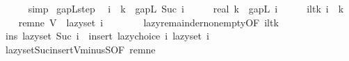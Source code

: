\begin{isabellebody}
\ \ \ \ \isamarkupfalse%
\ simp\isanewline
{}\isamarkupfalse%
%
\endisatagproof
{\isafoldproof}%
%
\isadelimproof
\isanewline
%
\endisadelimproof
\isanewline
{}\isamarkupfalse%
\ gapL{\isacharunderscore}{\kern0pt}step{\isacharcolon}{\kern0pt}\isanewline
\ \ {\isachardoublequoteopen}i\ {\isacharless}{\kern0pt}\ k\ {\isasymLongrightarrow}\ gapL\ {\isacharparenleft}{\kern0pt}Suc\ i{\isacharparenright}{\kern0pt}\ {\isasymle}\ {\isacharparenleft}{\kern0pt}{}\ {\isacharminus}{\kern0pt}\ {}\ {\isacharslash}{\kern0pt}\ real\ k{\isacharparenright}{\kern0pt}\ {\isacharasterisk}{\kern0pt}\ gapL\ i{\isachardoublequoteclose}\isanewline
%
\isadelimproof
%
\endisadelimproof
%
\isatagproof
{}\isamarkupfalse%
\ {\isacharminus}{\kern0pt}\isanewline
\ \ \isamarkupfalse%
\ i{\isacharunderscore}{\kern0pt}lt{\isacharunderscore}{\kern0pt}k{\isacharcolon}{\kern0pt}\ {\isachardoublequoteopen}i\ {\isacharless}{\kern0pt}\ k{\isachardoublequoteclose}\isanewline
\isanewline
\ \ \isamarkupfalse%
\ rem{\isacharunderscore}{\kern0pt}ne{\isacharcolon}{\kern0pt}\ {\isachardoublequoteopen}V\ {\isacharminus}{\kern0pt}\ lazy{\isacharunderscore}{\kern0pt}set\ i\ {\isasymnoteq}\ {\isacharbraceleft}{\kern0pt}{\isacharbraceright}{\kern0pt}{\isachardoublequoteclose}\isanewline
\ \ \ \ \isamarkupfalse%
\ lazy{\isacharunderscore}{\kern0pt}remainder{\isacharunderscore}{\kern0pt}nonempty{\isacharbrackleft}{\kern0pt}OF\ i{\isacharunderscore}{\kern0pt}lt{\isacharunderscore}{\kern0pt}k{\isacharbrackright}{\kern0pt}\ \isakeywordONE{{\isachardot}{\kern0pt}}\isamarkupfalse%
\isanewline
\isanewline
\ \ \isamarkupfalse%
\ ins{\isacharcolon}{\kern0pt}\ {\isachardoublequoteopen}lazy{\isacharunderscore}{\kern0pt}set\ {\isacharparenleft}{\kern0pt}Suc\ i{\isacharparenright}{\kern0pt}\ {\isacharequal}{\kern0pt}\ insert\ {\isacharparenleft}{\kern0pt}lazy{\isacharunderscore}{\kern0pt}choice\ i{\isacharparenright}{\kern0pt}\ {\isacharparenleft}{\kern0pt}lazy{\isacharunderscore}{\kern0pt}set\ i{\isacharparenright}{\kern0pt}{\isachardoublequoteclose}\isanewline
\ \ \ \ \isamarkupfalse%
\ lazy{\isacharunderscore}{\kern0pt}set{\isacharunderscore}{\kern0pt}Suc{\isacharunderscore}{\kern0pt}insert{\isacharunderscore}{\kern0pt}V{\isacharunderscore}{\kern0pt}minus{\isacharunderscore}{\kern0pt}S{\isacharbrackleft}{\kern0pt}OF\ rem{\isacharunderscore}{\kern0pt}ne{\isacharbrackright}{\kern0pt}\ \isakeywordONE{{\isachardot}{\kern0pt}}\isamarkupfalse%

\end{isabellebody}
